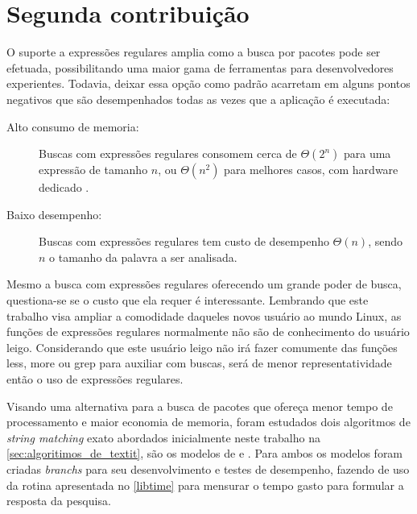 

\section{Segunda contribuição} %
\label{sec:segunda_contribui_o}

O suporte a expressões regulares amplia como a busca por pacotes pode ser efetuada, possibilitando uma maior gama de ferramentas para desenvolvedores experientes. Todavia, deixar essa opção como padrão acarretam em alguns pontos negativos que são desempenhados todas as vezes que a aplicação é executada:

\begin{description}
	\item [Alto consumo de memoria:] Buscas com expressões regulares consomem cerca de $\Theta(2^n)$ para uma expressão de tamanho $n$, ou $\Theta(n^2)$ para melhores casos, com hardware dedicado \cite{sidhu2001fast}.
	\item [Baixo desempenho:] Buscas com expressões regulares tem custo de desempenho $\Theta(n)$, sendo $n$ o tamanho da palavra a ser analisada.
\end{description}

Mesmo a busca com expressões regulares oferecendo um grande poder de busca, questiona-se se o custo que ela requer é interessante. Lembrando que este trabalho visa ampliar a comodidade daqueles novos usuário ao mundo Linux, as funções de expressões regulares normalmente não são de conhecimento do usuário leigo. Considerando que este usuário leigo não irá fazer comumente das funções {\code less}, {\code more} ou {\code grep} para auxiliar com buscas, será de menor representatividade então o uso de expressões regulares.



Visando uma alternativa para a busca de pacotes que ofereça menor tempo de processamento e maior economia de memoria, foram estudados dois algoritmos de \textit{string matching} exato abordados inicialmente neste trabalho na \autoref{sec:algoritimos_de_textit}, são os modelos de  e . Para ambos os modelos foram criadas \textit{branchs} para seu desenvolvimento e testes de desempenho, fazendo de uso da rotina apresentada no \autoref{libtime} para mensurar o tempo gasto para formular a resposta da pesquisa. 

